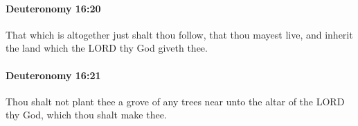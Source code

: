 		\paragraph{Deuteronomy 16:20} %
			\label{DEUTERONOMY-16-20}

			That which is altogether just shalt thou follow, that thou mayest live, and inherit the land which the LORD thy God giveth thee.


		\paragraph{Deuteronomy 16:21} %
			\label{DEUTERONOMY-16-21}

			Thou shalt not plant thee a grove of any trees near unto the altar of the LORD thy God, which thou shalt make thee.



